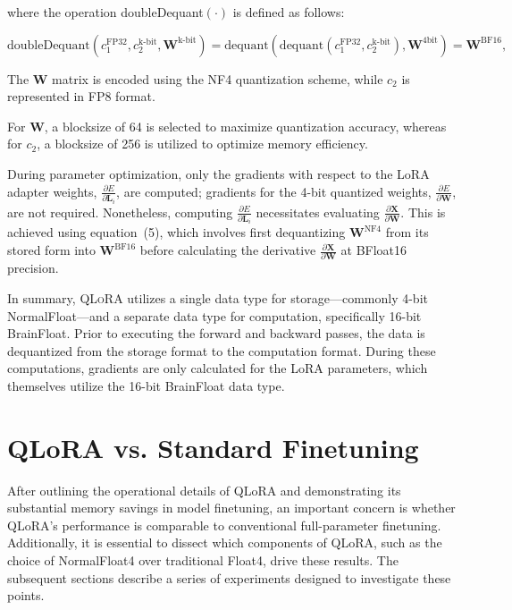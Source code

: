 where the operation doubleDequant$(\cdot)$ is defined as follows:

\begin{equation}
    \text{doubleDequant}(c_1^{\text{FP32}}, c_2^{\text{k-bit}}, \mathbf{W}^{\text{k-bit}}) = \text{dequant}(\text{dequant}(c_1^{\text{FP32}}, c_2^{\text{k-bit}}), \mathbf{W}^{\text{4bit}}) = \mathbf{W}^{\text{BF16}},
\end{equation}

The $\mathbf{W}$ matrix is encoded using the NF4 quantization scheme, while $c_2$ is represented in FP8 format.

For $\mathbf{W}$, a blocksize of 64 is selected to maximize quantization accuracy, whereas for $c_2$, a blocksize of 256 is utilized to optimize memory efficiency.

During parameter optimization, only the gradients with respect to the LoRA adapter weights, $\frac{\partial E}{\partial \mathbf{L}_i}$, are computed; gradients for the 4-bit quantized weights, $\frac{\partial E}{\partial \mathbf{W}}$, are not required. Nonetheless, computing $\frac{\partial E}{\partial \mathbf{L}_i}$ necessitates evaluating $\frac{\partial \mathbf{X}}{\partial \mathbf{W}}$. This is achieved using equation~(5), which involves first dequantizing $\mathbf{W}^{\text{NF4}}$ from its stored form into $\mathbf{W}^{\text{BF16}}$ before calculating the derivative $\frac{\partial \mathbf{X}}{\partial \mathbf{W}}$ at BFloat16 precision.

In summary, \textsc{QLoRA} utilizes a single data type for storage—commonly 4-bit NormalFloat—and a separate data type for computation, specifically 16-bit BrainFloat. Prior to executing the forward and backward passes, the data is dequantized from the storage format to the computation format. During these computations, gradients are only calculated for the LoRA parameters, which themselves utilize the 16-bit BrainFloat data type.

\section{QLoRA vs. Standard Finetuning}
\label{sec:comp_to_std}

After outlining the operational details of QLoRA and demonstrating its substantial memory savings in model finetuning, an important concern is whether QLoRA’s performance is comparable to conventional full-parameter finetuning. Additionally, it is essential to dissect which components of QLoRA, such as the choice of NormalFloat4 over traditional Float4, drive these results. The subsequent sections describe a series of experiments designed to investigate these points.

